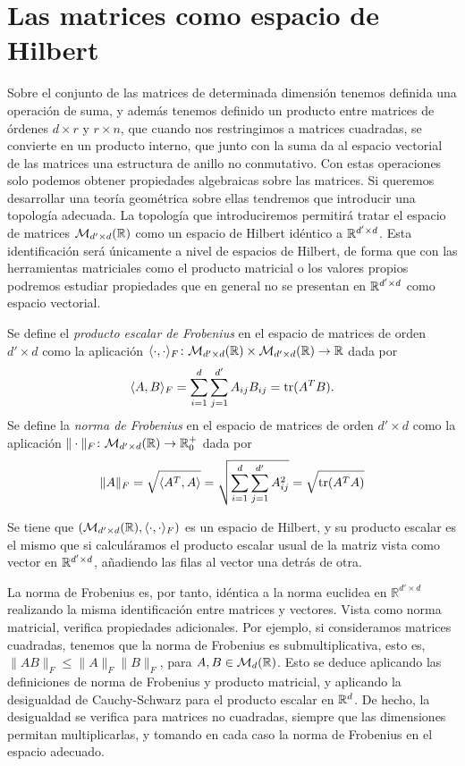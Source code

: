 \section{Las matrices como espacio de Hilbert}

Sobre el conjunto de las matrices de determinada dimensión tenemos definida una operación de suma, y además tenemos definido un producto entre matrices de órdenes $d \times r$ y $r \times n$, que cuando nos restringimos a matrices cuadradas, se convierte en un producto interno, que junto con la suma da al espacio vectorial de las matrices una estructura de anillo no conmutativo. Con estas operaciones solo podemos obtener propiedades algebraicas sobre las matrices. Si queremos desarrollar una teoría geométrica sobre ellas tendremos que introducir una topología adecuada. La topología que introduciremos permitirá tratar el espacio de matrices $\mathcal{M}_{d'\times d}(\mathbb{R})$ como un espacio de Hilbert idéntico a $\mathbb{R}^{d'\times d}$. Esta identificación será únicamente a nivel de espacios de Hilbert, de forma que con las herramientas matriciales como el producto matricial o los valores propios podremos estudiar propiedades que en general no se presentan en $\mathbb{R}^{d'\times d}$ como espacio vectorial.

\begin{definition}
    Se define el \emph{producto escalar de Frobenius} en el espacio de matrices de orden $d' \times d$ como la aplicación $\langle \cdot, \cdot \rangle_F \colon \mathcal{M}_{d' \times d}(\mathbb{R}) \times \mathcal{M}_{d' \times d}(\mathbb{R}) \to \mathbb{R}$ dada por
    \[ \langle A, B \rangle_F = \sum_{i=1}^d\sum_{j=1}^{d'} A_{ij}B_{ij} = \operatorname{tr}(A^TB). \]
    Se define la \emph{norma de Frobenius} en el espacio de matrices de orden $d' \times d$ como la aplicación $\|\cdot \|_F \colon \mathcal{M}_{d' \times d}(\mathbb{R}) \to \mathbb{R}^+_0$ dada por
    \[ \|A\|_F = \sqrt{\langle A^T, A \rangle} = \sqrt{\sum_{i=1}^d\sum_{j=1}^{d'}A_{ij}^2} = \sqrt{\operatorname{tr}(A^TA)} \]
\end{definition}

Se tiene que $(\mathcal{M}_{d'\times d}(\mathbb{R}),\langle \cdot, \cdot \rangle_F)$ es un espacio de Hilbert, y su producto escalar es el mismo que si calculáramos el producto escalar usual de la matriz vista como vector en $\mathbb{R}^{d' \times d}$, añadiendo las filas al vector una detrás de otra.

La norma de Frobenius es, por tanto, idéntica a la norma euclidea en $\mathbb{R}^{d'\times d}$ realizando la misma identificación entre matrices y vectores. Vista como norma matricial, verifica propiedades adicionales. Por ejemplo, si consideramos matrices cuadradas, tenemos que la norma de Frobenius es submultiplicativa, esto es, $\|AB\|_F \le \|A\|_F\|B\|_F$, para $A, B \in \mathcal{M}_d(\mathbb{R})$. Esto se deduce aplicando las definiciones de norma de Frobenius y producto matricial, y aplicando la desigualdad de Cauchy-Schwarz para el producto escalar en $\mathbb{R}^d$. De hecho, la desigualdad se verifica para matrices no cuadradas, siempre que las dimensiones permitan multiplicarlas, y tomando en cada caso la norma de Frobenius en el espacio adecuado.

